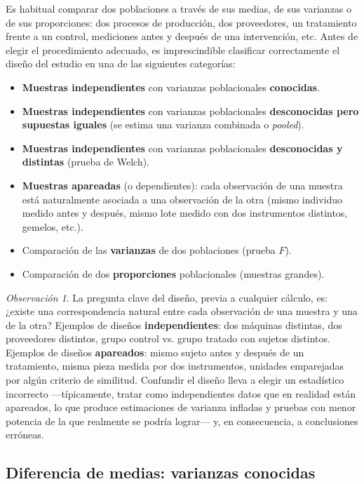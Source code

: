 \documentclass[11pt,a4paper]{article}
\theoremstyle{plain}
\theoremstyle{definition}
\theoremstyle{remark}
\newtheorem{observacion}[teorema]{Observación}
\begin{document}
Es habitual comparar dos poblaciones a través de sus medias, de sus varianzas o de sus proporciones: dos procesos de producción, dos proveedores, un tratamiento frente a un control, mediciones antes y después de una intervención, etc. Antes de elegir el procedimiento adecuado, es imprescindible clasificar correctamente el diseño del estudio en una de las siguientes categorías:

\begin{itemize}[nosep]
\item \textbf{Muestras independientes} con varianzas poblacionales \textbf{conocidas}.
\item \textbf{Muestras independientes} con varianzas poblacionales \textbf{desconocidas pero supuestas iguales} (se estima una varianza combinada o \emph{pooled}).
\item \textbf{Muestras independientes} con varianzas poblacionales \textbf{desconocidas y distintas} (prueba de Welch).
\item \textbf{Muestras apareadas} (o dependientes): cada observación de una muestra está naturalmente asociada a una observación de la otra (mismo individuo medido antes y después, mismo lote medido con dos instrumentos distintos, gemelos, etc.).
\item Comparación de las \textbf{varianzas} de dos poblaciones (prueba $F$).
\item Comparación de dos \textbf{proporciones} poblacionales (muestras grandes).
\end{itemize}

\begin{observacion}
La pregunta clave del diseño, previa a cualquier cálculo, es: ¿existe una correspondencia natural entre cada observación de una muestra y una de la otra? Ejemplos de diseños \textbf{independientes}: dos máquinas distintas, dos proveedores distintos, grupo control vs. grupo tratado con sujetos distintos. Ejemplos de diseños \textbf{apareados}: mismo sujeto antes y después de un tratamiento, misma pieza medida por dos instrumentos, unidades emparejadas por algún criterio de similitud. Confundir el diseño lleva a elegir un estadístico incorrecto —típicamente, tratar como independientes datos que en realidad están apareados, lo que produce estimaciones de varianza infladas y pruebas con menor potencia de la que realmente se podría lograr— y, en consecuencia, a conclusiones erróneas.
\end{observacion}

\subsection{Diferencia de medias: varianzas conocidas}
\end{document}
